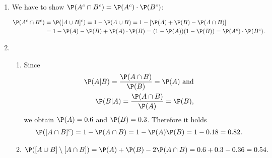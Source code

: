 \begin{solution}

\phantom{}

\begin{enumerate}[label = (\alph*)]
  \item
  We have to show $\P(A^c \cap B^c) = \P(A^c)\cdot\P(B^c)$:

  \begin{align*}
    \P(A^c \cap B^c) &= \P([A \cup B]^c) =
    1 - \P(A \cup B) = 1 - [\P(A) + \P(B) - \P(A \cap B)] \\
    &= 1 - \P(A) - \P(B) + \P(A)\cdot\P(B)
    = (1 - \P(A))(1 - \P(B))
    = \P(A^c)\cdot\P(B^c).
  \end{align*}

  \item
  \begin{enumerate}[label = (\roman*)]
      \item Since
      \begin{align*}
        \P(A|B) = \frac{\P(A\cap B)}{\P(B)} = \P(A) \text{ and} \\
        \P(B|A) = \frac{\P(A\cap B)}{\P(A)} = \P(B), \\
      \end{align*}
      we obtain $\P(A) = 0.6$ and $\P(B) = 0.3$. Therefore it holds
      \begin{align*}
        \P([A \cap B]^c) = 1 - \P(A \cap B) = 1 - \P(A)\P(B)
        = 1 - 0.18 = 0.82.
      \end{align*}
      \item
      \begin{align*}
        \P([A \cup B]\setminus [A \cap B])
        = \P(A) + \P(B) - 2\P(A \cap B)
        = 0.6 + 0.3 - 0.36 = 0.54.
      \end{align*}
  \end{enumerate}
\end{enumerate}



\end{solution}

